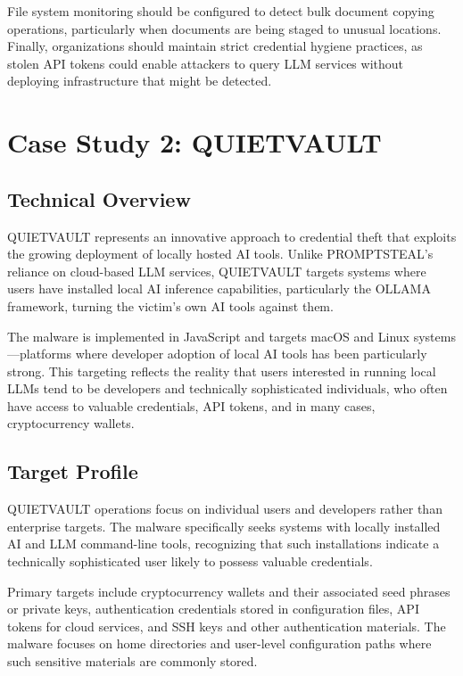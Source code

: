 \documentclass[12pt,a4paper]{article}
\begin{document}
File system monitoring should be configured to detect bulk document copying operations, particularly when documents are being staged to unusual locations. Finally, organizations should maintain strict credential hygiene practices, as stolen API tokens could enable attackers to query LLM services without deploying infrastructure that might be detected.

\section{Case Study 2: QUIETVAULT}

\subsection{Technical Overview}

QUIETVAULT represents an innovative approach to credential theft that exploits the growing deployment of locally hosted AI tools. Unlike PROMPTSTEAL's reliance on cloud-based LLM services, QUIETVAULT targets systems where users have installed local AI inference capabilities, particularly the OLLAMA framework, turning the victim's own AI tools against them.

The malware is implemented in JavaScript and targets macOS and Linux systems—platforms where developer adoption of local AI tools has been particularly strong. This targeting reflects the reality that users interested in running local LLMs tend to be developers and technically sophisticated individuals, who often have access to valuable credentials, API tokens, and in many cases, cryptocurrency wallets.

\subsection{Target Profile}

QUIETVAULT operations focus on individual users and developers rather than enterprise targets. The malware specifically seeks systems with locally installed AI and LLM command-line tools, recognizing that such installations indicate a technically sophisticated user likely to possess valuable credentials.

Primary targets include cryptocurrency wallets and their associated seed phrases or private keys, authentication credentials stored in configuration files, API tokens for cloud services, and SSH keys and other authentication materials. The malware focuses on home directories and user-level configuration paths where such sensitive materials are commonly stored.
\end{document}
